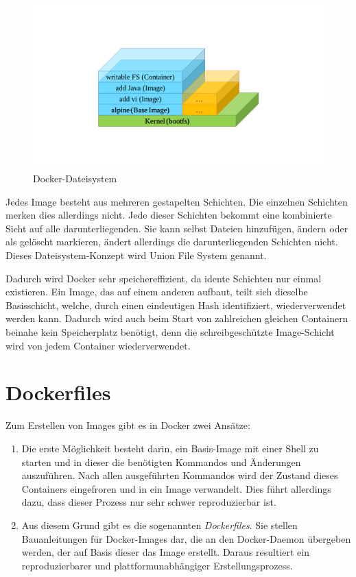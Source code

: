 \begin{figure}[htbp]
    \centering
    \includegraphics[width=0.7\linewidth,clip,trim=130 130 130 110]{images/docker-filesystem}
    \caption{Docker-Dateisystem}
\label{fig:docker-dateisystem}
\end{figure}

\noindent Jedes Image besteht aus mehreren gestapelten Schichten.
Die einzelnen Schichten merken dies allerdings nicht.
Jede dieser Schichten bekommt eine kombinierte Sicht auf alle darunterliegenden.
Sie kann selbst Dateien hinzufügen, ändern oder als gelöscht markieren, ändert allerdings die darunterliegenden Schichten nicht.
Dieses Dateisystem-Konzept wird Union File System genannt.

Dadurch wird Docker sehr speichereffizient, da idente Schichten nur einmal existieren.
Ein Image, das auf einem anderen aufbaut, teilt sich dieselbe Basisschicht, welche, durch einen eindeutigen Hash identifiziert, wiederverwendet werden kann.
Dadurch wird auch beim Start von zahlreichen gleichen Containern beinahe kein Speicherplatz benötigt, denn die schreibgeschützte Image-Schicht wird von jedem Container wiederverwendet.


\section{Dockerfiles}
\label{sec:dockerfiles}
Zum Erstellen von Images gibt es in Docker zwei Ansätze:
\begin{enumerate}
    \item Die erste Möglichkeit besteht darin, ein Basis-Image mit einer Shell zu starten und in dieser die benötigten Kommandos und Änderungen auszuführen.
    Nach allen ausgeführten Kommandos wird der Zustand dieses Containers eingefroren und in ein Image verwandelt.
    Dies führt allerdings dazu, dass dieser Prozess nur sehr schwer reproduzierbar ist.
    \item Aus diesem Grund gibt es die sogenannten \emph{Dockerfiles}.
    Sie stellen Bauanleitungen für Docker-Images dar, die an den Docker-Daemon übergeben werden, der auf Basis dieser das Image erstellt.
    Daraus resultiert ein reproduzierbarer und plattformunabhängiger Erstellungsprozess.
\end{enumerate}

